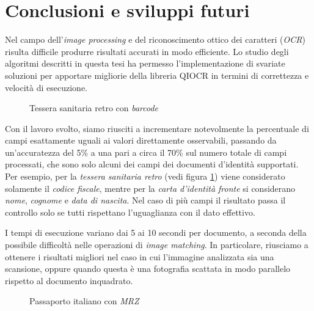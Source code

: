 \chapter*{Conclusioni e sviluppi futuri}

Nel campo dell'\textit{image processing} e del riconoscimento ottico dei caratteri (\textit{OCR}) risulta difficile produrre risultati accurati in modo efficiente. Lo studio degli algoritmi descritti in questa tesi ha permesso l'implementazione di svariate soluzioni per apportare migliorie della libreria QIOCR in termini di correttezza e velocit\`a di esecuzione.\par
\begin{figure}
	\centering
	\caption{Tessera sanitaria retro con \textit{barcode}} \label{fig:ts-r-example}
\end{figure}
Con il lavoro svolto, siamo riusciti a incrementare notevolmente la percentuale di campi esattamente uguali ai valori direttamente osservabili, passando da un'accuratezza del 5\% a una pari a circa il 70\% sul numero totale di campi processati, che sono solo alcuni dei campi dei documenti d'identit\`a supportati. 
Per esempio, per la \textit{tessera sanitaria retro} (vedi figura \ref{fig:ts-r-example}) viene considerato solamente il \textit{codice fiscale}, mentre per la \textit{carta d'identit\`a fronte} si considerano \textit{nome}, \textit{cognome} e \textit{data di nascita}. Nel caso di pi\`u campi il risultato passa il controllo solo se tutti rispettano l'uguaglianza con il dato effettivo.\par 
I tempi di esecuzione variano dai 5 ai 10 secondi per documento, a seconda della possibile difficolt\`a nelle operazioni di \textit{image matching}. In particolare, riusciamo a ottenere i risultati migliori nel caso in cui l'immagine analizzata sia una scansione, oppure quando questa \`e una fotografia scattata in modo parallelo rispetto al documento inquadrato.\par
\begin{figure}
	\centering
	\caption[Passaporto italiano con \textit{MRZ}]{Passaporto italiano con \textit{MRZ}\protect\footnotemark} \label{fig:passport}
\end{figure}

